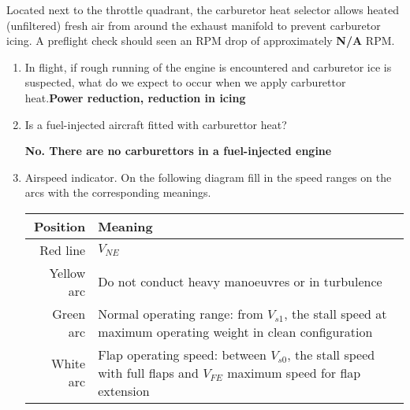 \documentclass[11pt]{article}
\begin{document}
\begin{enumerate}
\begin{enumerate}
		Located next to the throttle quadrant, the carburetor heat selector allows heated (unfiltered) fresh air
		from around the exhaust manifold to prevent carburetor icing. A preflight check should seen an RPM drop of 
		approximately \textbf{N/A} RPM. 
		\begin{enumerate}
			\item In flight, if rough running of the engine is encountered and carburetor ice is suspected, 
			what do we expect to occur when we apply carburettor heat.\hfill \textbf{Power reduction, reduction in icing}
			\item Is a fuel-injected aircraft fitted with carburettor heat?

			\textbf{No. There are no carburettors in a fuel-injected engine}
			\item Airspeed indicator. On the following diagram fill in the speed ranges on the arcs
			with the corresponding meanings.
			\begin{tabularx}{\linewidth}{rX}
			\toprule
			\textbf{Position} & \textbf{Meaning} \\
			\midrule
			Red line & \(V_{NE}\) \\
			Yellow arc & Do not conduct heavy manoeuvres or in turbulence \\
			Green arc & Normal operating range: from \(V_{s1}\), the stall speed at maximum operating weight in clean configuration \\
			White arc & Flap operating speed: between \(V_{s0}\), the stall speed with full flaps and \(V_{FE}\) maximum speed for flap extension \\
			\bottomrule
			\end{tabularx}
\iffalse
\def\centerarc[#1](#2)(#3:#4:#5:#6){ \draw[#1] ($(#2)+({#5*cos(-#3)},{#5*sin(-1 * #3)})$) arc (#3:#4:#5) -- ($(#2)+({#6*cos(-1 * #3)},{#6*sin(-1 * #3)})$) arc (#3:#4:#6) -- cycle; }

\begin{tikzpicture}
 
 \coordinate (c2) at (0,0);
   \draw[fill=green]
  ($(c2) + (45:20mm)$) arc (45:-200:20mm)
  --
  ($(c2) + (-200:25mm)$) arc (-200:45:25mm)
  -- cycle;
\end{tikzpicture}
\fi

		\end{enumerate}
	\end{enumerate}
\end{enumerate}
\end{document}
